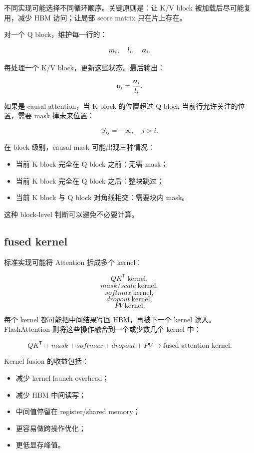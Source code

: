 不同实现可能选择不同循环顺序。关键原则是：让 K/V block 被加载后尽可能复用，减少 HBM 访问；让局部 score matrix 只在片上存在。

对一个 Q block，维护每一行的：

\[
m_i,\quad l_i,\quad \bm{a}_i.
\]

每处理一个 K/V block，更新这些状态。最后输出：

\[
\bm{o}_i=\frac{\bm{a}_i}{l_i}.
\]

如果是 causal attention，当 K block 的位置超过 Q block 当前行允许关注的位置，需要 mask 掉未来位置：

\[
S_{ij}=-\infty,\quad j>i.
\]

在 block 级别，causal mask 可能出现三种情况：

\begin{itemize}
\item 当前 K block 完全在 Q block 之前：无需 mask；
\item 当前 K block 完全在 Q block 之后：整块跳过；
\item 当前 K block 与 Q block 对角线相交：需要块内 mask。
\end{itemize}

这种 block-level 判断可以避免不必要计算。

\subsection{fused kernel}
\label{subsec:flashattention-fused-kernel}

标准实现可能将 Attention 拆成多个 kernel：

\[
QK^{\mathsf{T}}\ \text{kernel},
\]
\[
mask/scale\ \text{kernel},
\]
\[
softmax\ \text{kernel},
\]
\[
dropout\ \text{kernel},
\]
\[
PV\ \text{kernel}.
\]

每个 kernel 都可能把中间结果写回 HBM，再被下一个 kernel 读入。FlashAttention 则将这些操作融合到一个或少数几个 kernel 中：

\[
QK^{\mathsf{T}}
+
mask
+
softmax
+
dropout
+
PV
\rightarrow
\text{fused attention kernel}.
\]

Kernel fusion 的收益包括：

\begin{itemize}
\item 减少 kernel launch overhead；
\item 减少 HBM 中间读写；
\item 中间值停留在 register/shared memory；
\item 更容易做跨操作优化；
\item 更低显存峰值。
\end{itemize}


